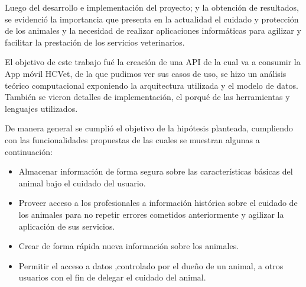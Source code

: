 \begin{conclusions}
    Luego del desarrollo e implementación del proyecto; y la obtención de resultados, 
    se evidenció la importancia  que presenta en la actualidad el cuidado y 
    protección de los animales y la necesidad de realizar aplicaciones informáticas para agilizar y facilitar la 
    prestación de los servicios veterinarios. 
    
    El objetivo de este trabajo fué la creación de una API de la cual va a consumir la App móvil HCVet, de la que pudimos ver sus casos de uso, se hizo un análisis teórico computacional exponiendo la arquitectura utilizada y el modelo de datos. También se vieron detalles de implementación, el porqué de las herramientas y lenguajes utilizados.
    
    De manera general se cumplió el objetivo de la hipótesis planteada, cumpliendo con las funcionalidades propuestas de las cuales se muestran algunas a continuación:
    \begin{itemize}
    	\item Almacenar información de forma segura sobre las características básicas del animal bajo el cuidado del usuario.
    	\item Proveer acceso a los profesionales a información histórica sobre el cuidado de los animales para no repetir errores cometidos anteriormente y agilizar la aplicación de sus servicios.
    	\item Crear de forma rápida nueva información sobre los animales.
    	\item Permitir el acceso a datos ,controlado por el dueño de un animal, a otros usuarios con el fin de delegar el cuidado del animal.
    
    \end{itemize}
    

\end{conclusions}
